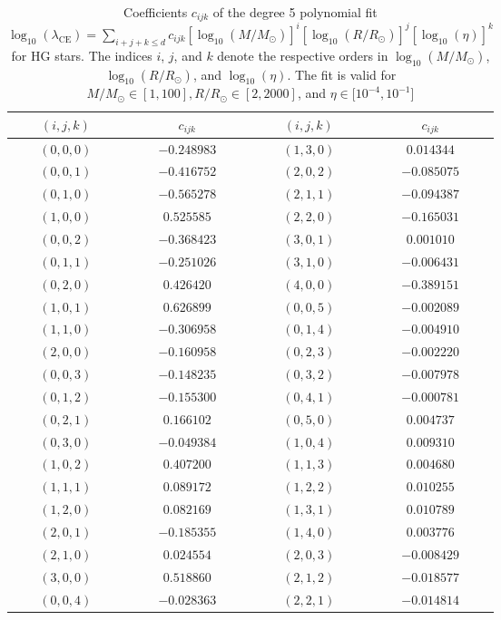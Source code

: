 \begin{table}
\centering
\caption{Coefficients $c_{ijk}$ of the degree 5 polynomial fit $\log_{10}(\lambda_{\mathrm{CE}})=\sum_{i+j+k\leq d}c_{ijk}\left[\log_{10}(M/M_\odot)\right]^i\left[\log_{10}(R/R_\odot)\right]^j\left[\log_{10}(\eta)\right]^k$ for HG stars. The indices $i$, $j$, and $k$ denote the respective orders in $\log_{10}(M/M_\odot)$, $\log_{10}(R/R_\odot)$, and $\log_{10}(\eta)$. The fit is valid for $M/M_\odot\in[1,100], R/R_\odot\in[2,2000]$, and $\eta\in[10^{-4},10^{-1}$]}
\label{tab:tab:lambda_ce_3d_coef_HG}
\begin{tabular}{cc@{\qquad}cc}
\hline
$(i,j,k)$ & $c_{ijk}$ & $(i,j,k)$ & $c_{ijk}$ \\
\hline
$(0,0,0)$ & $-0.248983$ & $(1,3,0)$ & $0.014344$ \\
$(0,0,1)$ & $-0.416752$ & $(2,0,2)$ & $-0.085075$ \\
$(0,1,0)$ & $-0.565278$ & $(2,1,1)$ & $-0.094387$ \\
$(1,0,0)$ & $0.525585$ & $(2,2,0)$ & $-0.165031$ \\
$(0,0,2)$ & $-0.368423$ & $(3,0,1)$ & $0.001010$ \\
$(0,1,1)$ & $-0.251026$ & $(3,1,0)$ & $-0.006431$ \\
$(0,2,0)$ & $0.426420$ & $(4,0,0)$ & $-0.389151$ \\
$(1,0,1)$ & $0.626899$ & $(0,0,5)$ & $-0.002089$ \\
$(1,1,0)$ & $-0.306958$ & $(0,1,4)$ & $-0.004910$ \\
$(2,0,0)$ & $-0.160958$ & $(0,2,3)$ & $-0.002220$ \\
$(0,0,3)$ & $-0.148235$ & $(0,3,2)$ & $-0.007978$ \\
$(0,1,2)$ & $-0.155300$ & $(0,4,1)$ & $-0.000781$ \\
$(0,2,1)$ & $0.166102$ & $(0,5,0)$ & $0.004737$ \\
$(0,3,0)$ & $-0.049384$ & $(1,0,4)$ & $0.009310$ \\
$(1,0,2)$ & $0.407200$ & $(1,1,3)$ & $0.004680$ \\
$(1,1,1)$ & $0.089172$ & $(1,2,2)$ & $0.010255$ \\
$(1,2,0)$ & $0.082169$ & $(1,3,1)$ & $0.010789$ \\
$(2,0,1)$ & $-0.185355$ & $(1,4,0)$ & $0.003776$ \\
$(2,1,0)$ & $0.024554$ & $(2,0,3)$ & $-0.008429$ \\
$(3,0,0)$ & $0.518860$ & $(2,1,2)$ & $-0.018577$ \\
$(0,0,4)$ & $-0.028363$ & $(2,2,1)$ & $-0.014814$ \\

\end{tabular}
\end{table}
